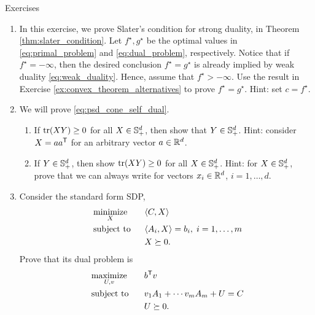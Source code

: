 \begin{xcb}{Exercises}
\begin{enumerate}[label=\thechapter.\arabic*]
\item \label{ex:slater_condition}
  In this exercise, we prove Slater's condition for strong duality, in Theorem 
  \ref{thm:slater_condition}. Let $f^\star, g^\star$ be the optimal values in 
  \eqref{eq:primal_problem} and \eqref{eq:dual_problem}, respectively. Notice
  that if $f^\star = -\infty$, then the desired conclusion $f^\star = g^\star$
  is already implied by weak duality \eqref{eq:weak_duality}. Hence, assume that 
  $f^\star > -\infty$. Use the result in Exercise
  \ref{ex:convex_theorem_alternatives} to prove $f^\star = g^\star$. Hint: set
  $c = f^\star$.  

\item \label{ex:psd_cone_self_dual}
  We will prove \eqref{eq:psd_cone_self_dual}. 

\begin{enumerate}[label=\alph*.]
\item If $\operatorname{tr}(XY) \geq 0$ for all $X \in \mathbb{S}_+^d$, then show that $Y \in
  \mathbb{S}_+^d$. Hint: consider $X = a a^{\mathsf{T}}$ for an arbitrary vector $a \in \mathbb{R}^d$.  

\item If $Y \in \mathbb{S}_+^d$, then show $\operatorname{tr}(XY) \geq 0$ for all $X \in
  \mathbb{S}_+^d$. Hint: for $X \in \mathbb{S}_+^d$, prove that we can always write  for vectors $x_i \in \mathbb{R}^d$, $i = 1,\dots,d$. 
\end{enumerate}

\item \label{ex:sdp_std_dual} 
  Consider the standard form SDP,
  \begin{alignat*}{2}
  &\operatorname*{minimize}_X \quad && \langle C, X \rangle \\
  &\operatorname{subject\,\,to} && \langle A_i, X \rangle = b_i, \; i=1,\dots,m \\
  & && X \succeq 0.
  \end{alignat*}
  Prove that its dual problem is 
  \begin{alignat*}{2}
  &\operatorname*{maximize}_{U,v} \quad && b^{\mathsf{T}} v \\
  &\operatorname{subject\,\,to} && v_1 A_1 + \cdots v_m A_m + U = C \\
  & && U \succeq 0.
  \end{alignat*}


\end{enumerate}
\end{xcb}
